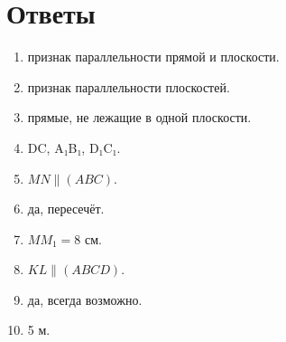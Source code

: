 \documentclass{umk-matematika}
\begin{document}
\newpage
\section*{Ответы}

\begin{enumerate}
  \item признак параллельности прямой и плоскости.
  \item признак параллельности плоскостей.
  \item прямые, не лежащие в одной плоскости.
  \item DC, A₁B₁, D₁C₁.
  \item $MN \parallel (ABC)$.
  \item да, пересечёт.
  \item $MM_1 = 8$ см.
  \item $KL \parallel (ABCD)$.
  \item да, всегда возможно.
  \item 5 м.
\end{enumerate}
\end{document}
